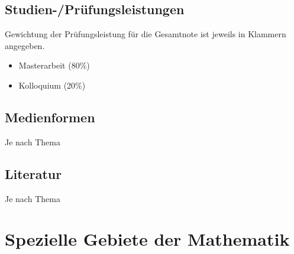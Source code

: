 \section*{Studien-/Prüfungsleistungen\label{/mi-2017/modulbeschreibungen-master/MA_All_Modul_Masterarbeit}}\label{studien-pruxfcfungsleistungenpathlabelmi-2017modulbeschreibungen-mastermaux5fallux5fmodulux5fmasterarbeit}

Gewichtung der Prüfungsleistung für die Gesamtnote ist jeweils in
Klammern angegeben.

\begin{itemize}
\tightlist
\item
  Masterarbeit (80\%)
\item
  Kolloquium (20\%)
\end{itemize}

\section*{Medienformen\label{/mi-2017/modulbeschreibungen-master/MA_All_Modul_Masterarbeit}}\label{medienformenpathlabelmi-2017modulbeschreibungen-mastermaux5fallux5fmodulux5fmasterarbeit}

Je nach Thema

\section*{Literatur\label{/mi-2017/modulbeschreibungen-master/MA_All_Modul_Masterarbeit}}\label{literaturpathlabelmi-2017modulbeschreibungen-mastermaux5fallux5fmodulux5fmasterarbeit}

Je nach Thema

\chapter{Spezielle Gebiete der
Mathematik\label{/mi-2017/modulbeschreibungen-master/MA_All_Modul_Mathematik}}\label{spezielle-gebiete-der-mathematikpathlabelmi-2017modulbeschreibungen-mastermaux5fallux5fmodulux5fmathematik}

